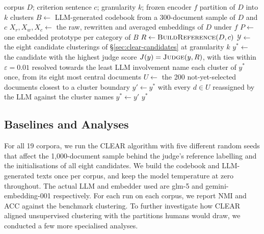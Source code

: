 \documentclass[11pt,a4paper,oneside]{report}
\begin{document}
\begin{algorithm}[htbp]
\caption{The CLEAR algorithm}
\label{alg:clear}
\begin{algorithmic}[1]
\Require corpus $D$; criterion sentence $c$; granularity $k$; frozen encoder $f$
\Ensure  partition of $D$ into $k$ clusters
\Statex
\State $B \gets$ LLM-generated codebook from a 300-document sample of $D$ and $c$
\State $X_r, X_w, X_c \gets$ the raw, rewritten and averaged embeddings of $D$ under $f$
\State $P \gets$ one embedded prototype per category of $B$
\State $R \gets \Call{BuildReference}{D, c}$ 
\Statex
\State $\mathcal{Y} \gets$ the eight candidate clusterings of \S\ref{sec:clear-candidates} at granularity $k$
\State $y^{\ast} \gets$ the candidate with the highest judge score $J(y) = \Call{Judge}{y, R}$, with ties within $\varepsilon = 0.01$ resolved towards the least LLM involvement
\Statex
\State name each cluster of $y^{\ast}$ once, from its eight most central documents
\State $U \gets$ the 200 not-yet-selected documents closest to a cluster boundary
\State $y' \gets y^{\ast}$ with every $d \in U$ reassigned by the LLM against the cluster names
\State $y^{\ast} \gets y'$ 
\EndIf
\EndFor
\State \Return $y^{\ast}$
\end{algorithmic}
\end{algorithm}








\subsection{Baselines and Analyses}

For all 19 corpora, we run the CLEAR algorithm with five different random seeds that affect the 1{,}000-document sample behind the judge's reference labelling and the initialisations of all eight candidates. We build the codebook and LLM-generated texts once per corpus, and keep the model temperature at zero throughout. The actual LLM and embedder used are {\small\ttfamily glm-5} and {\small\ttfamily gemini-embedding-001} \citep{lee2025gemini} respectively. For each run on each corpus, we report NMI and ACC against the benchmark clustering. To further investigate how CLEAR aligned unsupervised clustering with the partitions humans would draw, we conducted a few more specialised analyses.
\end{document}
